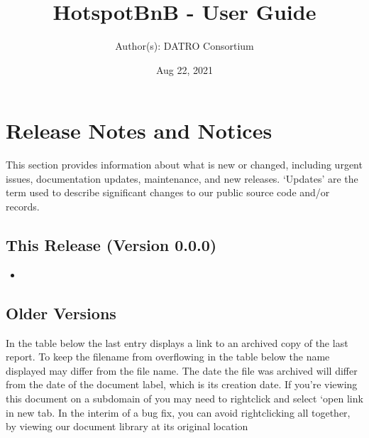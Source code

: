 \documentclass[letterpaper,10pt,openany,oneside,english]{sphinxmanual}
\title{HotspotBnB - User Guide}
\date{Aug 22, 2021}
\author{Author(s): DATRO Consortium}
\begin{document}
\pagestyle{empty}
\sphinxmaketitle
\pagestyle{plain}
\sphinxtableofcontents
\pagestyle{normal}
\label{\detokenize{index::doc}}



\chapter{Release Notes and Notices}
\label{\detokenize{releasenotes:release-notes-and-notices}}\label{\detokenize{releasenotes::doc}}
\sphinxAtStartPar
This section provides information about what is new or changed, including urgent issues, documentation updates, maintenance, and new releases.
\sphinxhyphen{} ‘Updates’ are the term used to describe significant changes to our public source code and/or records.


\section{This Release (Version 0.0.0)}
\label{\detokenize{releasenotes:this-release-version-0-0-0}}\begin{itemize}
\item {} 
\sphinxAtStartPar
{} \sphinxhyphen{} 

\end{itemize}


\section{Older Versions}
\label{\detokenize{releasenotes:older-versions}}
\sphinxAtStartPar
In the table below the last entry displays a link to an archived copy of the last report.
To keep the filename from overflowing in the table below the name displayed may differ from the file name.
The date the file was archived will differ from the date of the document label, which is its creation date.
If you’re viewing this document on a subdomain of  you may need to right\sphinxhyphen{}click and select ‘open link in new tab\textasciigrave{}.
In the interim of a bug fix, you can avoid right\sphinxhyphen{}clicking all together, by viewing our document library at its original location 
\end{document}
